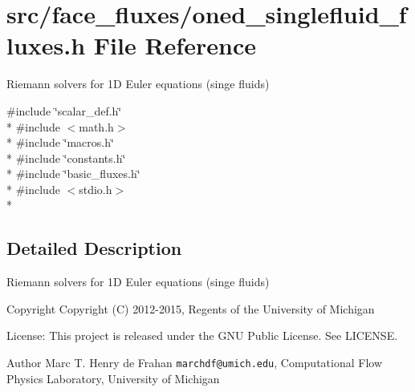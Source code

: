 \section{src/face\-\_\-fluxes/oned\-\_\-singlefluid\-\_\-fluxes.h File Reference}
\label{oned__singlefluid__fluxes_8h}


Riemann solvers for 1\-D Euler equations (singe fluids)  


{\ttfamily \#include \char`\"{}scalar\-\_\-def.\-h\char`\"{}}\\*
{\ttfamily \#include $<$math.\-h$>$}\\*
{\ttfamily \#include \char`\"{}macros.\-h\char`\"{}}\\*
{\ttfamily \#include \char`\"{}constants.\-h\char`\"{}}\\*
{\ttfamily \#include \char`\"{}basic\-\_\-fluxes.\-h\char`\"{}}\\*
{\ttfamily \#include $<$stdio.\-h$>$}\\*


\subsection{Detailed Description}
Riemann solvers for 1\-D Euler equations (singe fluids) \begin{DoxyCopyright}{Copyright}
Copyright (C) 2012-\/2015, Regents of the University of Michigan 
\end{DoxyCopyright}
\begin{DoxyParagraph}{License\-:}
This project is released under the G\-N\-U Public License. See L\-I\-C\-E\-N\-S\-E. 
\end{DoxyParagraph}
\begin{DoxyAuthor}{Author}
Marc T. Henry de Frahan {\tt marchdf@umich.\-edu}, Computational Flow Physics Laboratory, University of Michigan 
\end{DoxyAuthor}
